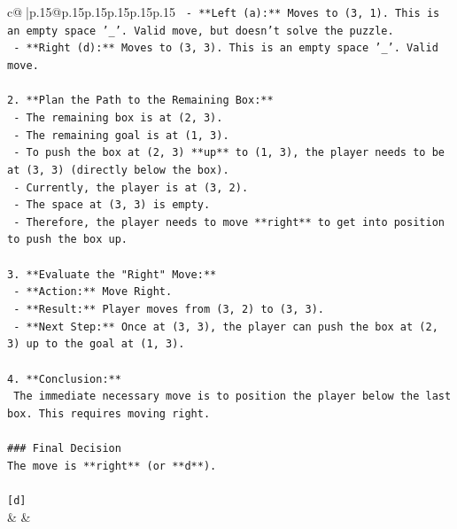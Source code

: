 \documentclass{article}
\begin{document}
{\begin{supertabular}{c@{$\;$}|p{.15\linewidth}@{}p{.15\linewidth}p{.15\linewidth}p{.15\linewidth}p{.15\linewidth}p{.15\linewidth}}
{{{\texttt{    {-} **Left (a):** Moves to (3, 1). This is an empty space '\_'. Valid move, but doesn't solve the puzzle.} \\
\texttt{    {-} **Right (d):** Moves to (3, 3). This is an empty space '\_'. Valid move.} \\
\\ 
\texttt{2.  **Plan the Path to the Remaining Box:**} \\
\texttt{    {-} The remaining box is at (2, 3).} \\
\texttt{    {-} The remaining goal is at (1, 3).} \\
\texttt{    {-} To push the box at (2, 3) **up** to (1, 3), the player needs to be at (3, 3) (directly below the box).} \\
\texttt{    {-} Currently, the player is at (3, 2).} \\
\texttt{    {-} The space at (3, 3) is empty.} \\
\texttt{    {-} Therefore, the player needs to move **right** to get into position to push the box up.} \\
\\ 
\texttt{3.  **Evaluate the "Right" Move:**} \\
\texttt{    {-} **Action:** Move Right.} \\
\texttt{    {-} **Result:** Player moves from (3, 2) to (3, 3).} \\
\texttt{    {-} **Next Step:** Once at (3, 3), the player can push the box at (2, 3) up to the goal at (1, 3).} \\
\\ 
\texttt{4.  **Conclusion:**} \\
\texttt{    The immediate necessary move is to position the player below the last box. This requires moving right.} \\
\\ 
\texttt{\#\#\# Final Decision} \\
\texttt{The move is **right** (or **d**).} \\
\\ 
\texttt{{[}d{]}} \\
            }
        }
    }
    & & \\ \\


\end{supertabular}}
\end{document}
